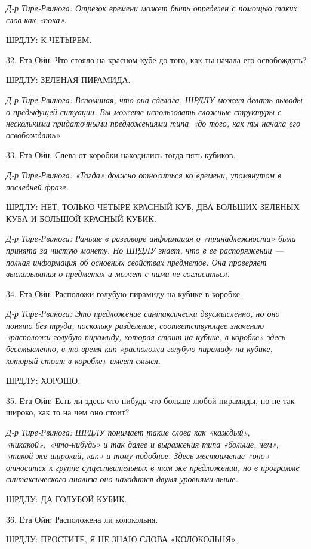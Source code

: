 \documentclass[../main.tex]{subfiles}
\begin{document}
\begin{dialogue}
\emph{Д-р Тире-Рвинога: Отрезок времени может быть определен с помощью таких слов как «пока».}

ШРДЛУ: К ЧЕТЫРЕМ.

32. Ета Ойн: Что стояло на красном кубе до того, как ты начала его освобождать?

ШРДЛУ: ЗЕЛЕНАЯ ПИРАМИДА.

\emph{Д-р Тире-Рвинога: Вспоминая, что она сделала, ШРДЛУ может делать выводы о предыдущей ситуации. Вы можете использовать сложные структуры с несколькими придаточными предложениями типа~«до того, как ты начала его освобождать».}

33. Ета Ойн: Слева от коробки находились тогда пять кубиков.

\emph{Д-р Тире-Рвинога: «Тогда» должно относиться ко времени, упомянутом в последней фразе.}

ШРДЛУ: НЕТ, ТОЛЬКО ЧЕТЫРЕ КРАСНЫЙ КУБ, ДВА БОЛЬШИХ ЗЕЛЕНЫХ КУБА И БОЛЬШОЙ КРАСНЫЙ КУБИК.

\emph{Д-р Тире-Рвинога: Раньше в разговоре информация о «принадлежности» была принята за чистую монету. Но ШРДЛУ знает, что в ее распоряжении --- полная информация об основных свойствах предметов. Она проверяет высказывания о предметах и может с ними не согласиться.}

34. Ета Ойн: Расположи голубую пирамиду на кубике в коробке.

\emph{Д-р Тире-Рвинога: Это предложение синтаксически двусмысленно, но оно понято без труда, поскольку разделение, соответствующее значению «расположи голубую пирамиду, которая стоит на кубике, в коробке» здесь бессмысленно, в то время как «расположи голубую пирамиду на кубике, который стоит в коробке» имеет смысл.}

ШРДЛУ: ХОРОШО.

35. Ета Ойн: Есть ли здесь что-нибудь что больше любой пирамиды, но не так широко, как то на чем оно стоит?

\emph{Д-р Тире-Рвинога: ШРДЛУ понимает такие слова как «каждый», «никакой»,~«что-нибудь» и так далее и выражения типа «больше, чем», «такой же широкий, как» и тому подобное. Здесь местоимение «оно» относится к группе существительных в том же предложении, но в программе синтаксического анализа оно находится двумя уровнями выше.}

ШРДЛУ: ДА ГОЛУБОЙ КУБИК.

36. Ета Ойн: Расположена ли колокольня.

ШРДЛУ: ПРОСТИТЕ, Я НЕ ЗНАЮ СЛОВА «КОЛОКОЛЬНЯ».


\end{dialogue}
\end{document}

